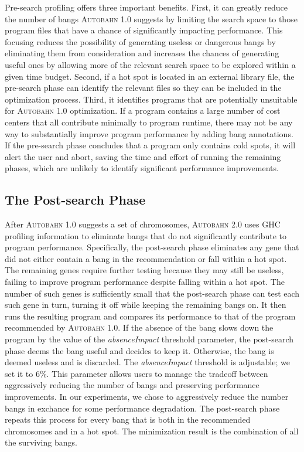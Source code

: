 \documentclass[sigplan,screen]{acmart}
\newcommand{\hotspot}[0]{hot spot}
\newcommand{\coldspots}[0]{cold spots}
\newcommand{\dangerous}[0]{dangerous}
\newcommand{\useful}[0]{useful}
\newcommand{\useless}[0]{useless}
\newcommand{\Ao}[0]{\textsc{Autobahn 1.0}}
\newcommand{\At}[0]{\textsc{Autobahn 2.0}}
\newcommand{\preopt}[0]{pre-search}
\newcommand{\postopt}[0]{post-search}
\newcommand{\Preopt}[0]{Pre-search}
\newcommand{\Postopt}[0]{Post-search}
\newcommand{\absim}[0]{\textit{absenceImpact}}
\begin{document}
\Preopt{} profiling offers three important benefits.
First, it can greatly reduce the number of bangs \Ao{} suggests by
limiting the search space to those program files that have a chance of
significantly impacting performance. This focusing reduces the
possibility of generating \useless{} or \dangerous{} bangs by
eliminating them from consideration
and
increases the chances of generating \useful{} ones by allowing more of
the relevant search space to be explored within a given time budget.
Second, if a \hotspot{} is located in an external library file,
the \preopt{} phase can identify the relevant files so they can be
included in the optimization process. 
Third, it identifies programs that are potentially unsuitable for
\Ao{} optimization. If a program contains a large number of cost
centers that all contribute minimally to program runtime, there may
not be any way to substantially improve program performance by adding
bang annotations. If the \preopt{} phase concludes that
a program only contains \coldspots{}, it will alert the user and
abort, saving the time and effort of running the remaining phases, 
which are unlikely to identify significant performance improvements.

\subsection{The \Postopt{} Phase}
After \Ao{} suggests a set of chromosomes,
\At{} uses GHC profiling information to eliminate 
bangs that do not significantly contribute to program performance.
Specifically, the \postopt{} phase 
eliminates any
gene that did not either contain a bang in the recommendation
or fall within a \hotspot{}. 
The remaining genes require
further testing because they may still be \useless{}, failing to
improve program performance despite falling within a \hotspot{}.
The number of such genes is sufficiently small that
the \postopt{} phase can test each such gene in turn, turning
it off while keeping the remaining bangs on.  It 
then runs the resulting program and compares its performance to that
of the program recommended by \Ao{}.
If the absence of the bang slows down the program by the value of the \absim{}
threshold parameter, the \postopt{} phase deems the bang useful and
decides to keep it. 
Otherwise, the bang is deemed \useless{} and is
discarded. The \absim{} threshold is adjustable; we set it to
6\%.  This parameter allows users to manage the tradeoff
between aggressively reducing the number of bangs and
preserving performance improvements.  In our experiments, we chose to
aggressively reduce the number bangs in exchance for some performance
degradation. 
The \postopt{} phase repeats this process for every bang
that is both in the recommended chromosomes and in a \hotspot{}. 
The minimization result is the combination of all the surviving
bangs.
\end{document}
